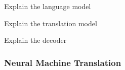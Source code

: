% 

Explain the language model

Explain the translation model

Explain the decoder









\clearpage
\subsubsection{Neural Machine Translation}

